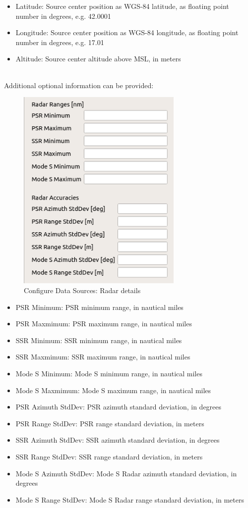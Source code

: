 \begin{itemize}
\item Latitude: Source center position as WGS-84 latitude, as floating point number in degrees, e.g. 42.0001
\item Longitude: Source center position as WGS-84 longitude, as floating point number in degrees, e.g. 17.01
\item Altitude: Source center altitude above MSL, in meters
\end{itemize}
\ \\

Additional optional information can be provided:

\begin{figure}[H]
  \center
    \includegraphics[width=8cm,frame]{figures/configure_data_sources_radar_details.png}
  \caption{Configure Data Sources: Radar details}
\end{figure}

\begin{itemize}
\item PSR Minimum: PSR minimum range, in nautical miles
\item PSR Maxmimum: PSR maximum range, in nautical miles
\item SSR Minimum: SSR minimum range, in nautical miles
\item SSR Maxmimum: SSR maximum range, in nautical miles
\item Mode S Minimum: Mode S minimum range, in nautical miles
\item Mode S Maxmimum: Mode S maximum range, in nautical miles
\item PSR Azimuth StdDev: PSR azimuth standard deviation, in degrees
\item PSR Range StdDev: PSR range standard deviation, in meters
\item SSR Azimuth StdDev: SSR azimuth standard deviation, in degrees
\item SSR Range StdDev: SSR range standard deviation, in meters
\item Mode S Azimuth StdDev: Mode S Radar azimuth standard deviation, in degrees
\item Mode S Range StdDev: Mode S Radar range standard deviation, in meters
\end{itemize}
\ \\

